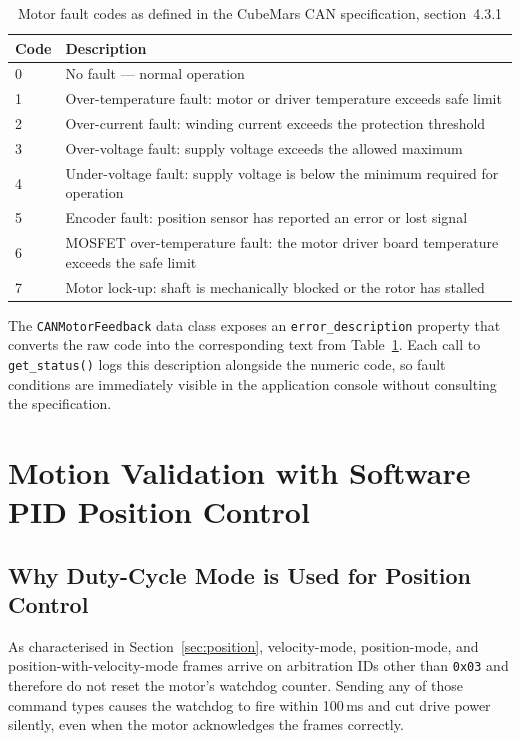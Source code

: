 \documentclass[12pt,a4paper]{article}
\begin{document}
\begin{table}[H]
  \centering
  \caption{Motor fault codes as defined in the CubeMars CAN specification, section~4.3.1}
  \label{tab:errors}
  \begin{tabular}{p{1.5cm} p{10cm}}
    \toprule
    Code & Description \\
    \midrule
    0 & No fault --- normal operation \\
    1 & Over-temperature fault: motor or driver temperature exceeds safe limit \\
    2 & Over-current fault: winding current exceeds the protection threshold \\
    3 & Over-voltage fault: supply voltage exceeds the allowed maximum \\
    4 & Under-voltage fault: supply voltage is below the minimum required for operation \\
    5 & Encoder fault: position sensor has reported an error or lost signal \\
    6 & MOSFET over-temperature fault: the motor driver board temperature exceeds the safe limit \\
    7 & Motor lock-up: shaft is mechanically blocked or the rotor has stalled \\
    \bottomrule
  \end{tabular}
\end{table}

The \texttt{CANMotorFeedback} data class exposes an \texttt{error\_description}
property that converts the raw code into the corresponding text from
Table~\ref{tab:errors}.  Each call to \texttt{get\_status()} logs this
description alongside the numeric code, so fault conditions are immediately
visible in the application console without consulting the specification.

\section{Motion Validation with Software PID Position Control}
\label{sec:motion}

\subsection{Why Duty-Cycle Mode is Used for Position Control}

As characterised in Section~\ref{sec:position}, velocity-mode,
position-mode, and position-with-velocity-mode frames arrive on
arbitration IDs other than \texttt{0x03} and therefore do not reset the
motor's watchdog counter.  Sending any of those command types causes
the watchdog to fire within 100\,ms and cut drive power silently, even
when the motor acknowledges the frames correctly.
\end{document}
